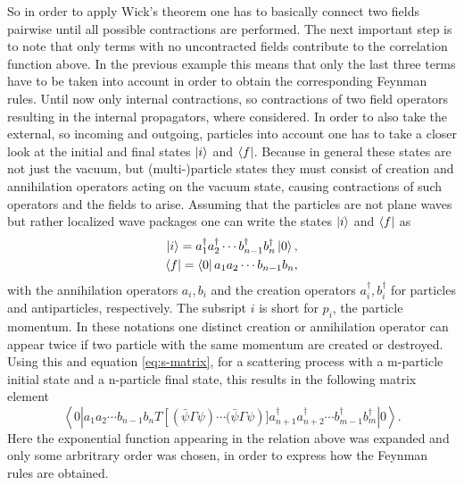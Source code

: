 So in order to apply Wick's theorem one has to basically connect two fields pairwise until all possible contractions are performed. \newline\indent
The next important step is to note that only terms with no uncontracted fields contribute to the correlation function above. In the previous example this means that only the last three terms have to be taken into account in order to obtain the corresponding Feynman rules. \newline\indent
Until now only internal contractions, so contractions of two field operators resulting in the internal propagators, where considered. In order to also take the external, so incoming and outgoing, particles into account one has to take a closer look at the initial and final states $\ket{i}$ and $\bra{f}$. Because in general these states are not just the vacuum, but (multi-)particle states they must consist of creation and annihilation operators acting on the vacuum state, causing contractions of such operators and the fields to arise. Assuming that the particles are not plane waves but rather localized wave packages one can write the states $\ket{i}$ and $\bra{f}$ as\cite{Kopp:2016}
\begin{align*}
\ket{i}=a_1^\dagger a_2^\dagger \cdots b_{n-1}^\dagger b_n^\dagger \ket{0},
\\
\bra{f}=\bra{0}a_1 a_2 \cdots b_{n-1}b_n,
\end{align*}
with the annihilation operators $a_i,b_i$ and the creation operators $a_i^\dagger,b_i^\dagger$ for particles and antiparticles, respectively. The subsript $i$ is short for $p_i$, the particle momentum. In these notations one distinct creation or annihilation operator can appear twice if two particle with the same momentum are created or destroyed. \newline\indent
Using this and equation \eqref{eq:s-matrix}, for a scattering process with a m-particle initial state and a n-particle final state, this results in the following matrix element \cite[Eq. 2.2]{Denner:1992vza}
\begin{equation}
\left<0\left|a_1 a_2 \cdots  b_{n-1} b_n T\left[\left(\bar{\psi}\Gamma\psi\right)\cdots(\bar{\psi}\Gamma\psi\right)]a_{n+1}^\dagger a_{n+2}^\dagger \cdots  b_{m-1}^\dagger b_m^\dagger\right|0\right>.
\label{eq:matrix_element}
\end{equation}
Here the exponential function appearing in the relation above was expanded and only some arbritrary order was chosen, in order to express how the Feynman rules are obtained.\newline\indent
